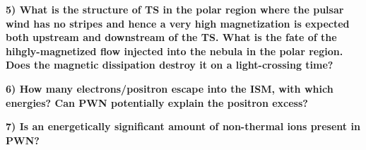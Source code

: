 \textbf{5) What is the structure of TS in the polar region where the pulsar wind has no stripes and hence a very high magnetization is expected both upstream and downstream of the TS. What is the fate of the hihgly-magnetized flow injected into the nebula in the polar region. Does the magnetic dissipation destroy it on a light-crossing time? }

\textbf{6) How many electrons/positron escape into the ISM, with which energies? Can PWN potentially explain the positron excess?}

\textbf{7) Is an energetically significant amount of non-thermal  ions present in PWN?}
